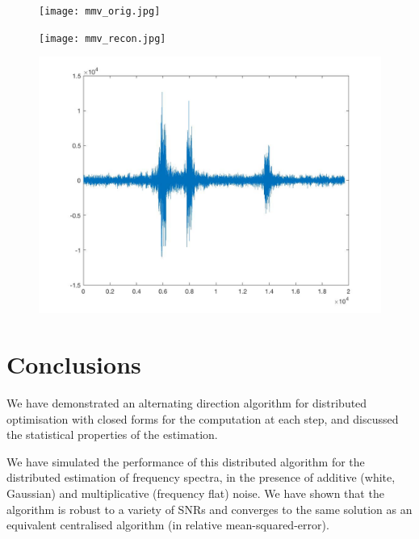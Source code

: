 \begin{figure}[h]
\centering
\texttt{[image: mmv\_orig.jpg]}
\caption{}
\label{ch5:fig:mmv-orig}
\end{figure}

\begin{figure}[h]
\centering
\texttt{[image: mmv\_recon.jpg]}
\caption{}
\label{ch5:fig:mmv-recon}
\end{figure}

\begin{figure}[h]
\centering
\includegraphics[height = 7.3 cm]{mmv-aty.jpg}
\caption{}
\label{ch5:aty}
\end{figure}

\section{Conclusions}
We have demonstrated an alternating direction algorithm for distributed optimisation with closed forms for the computation at each step, and discussed the statistical properties of the estimation. 

We have simulated the performance of this distributed algorithm for the distributed estimation of frequency spectra, in the presence of additive (white, Gaussian) and multiplicative (frequency flat) noise. We have shown that the algorithm is robust to a variety of SNRs and converges to the same solution as an equivalent centralised algorithm (in relative mean-squared-error).